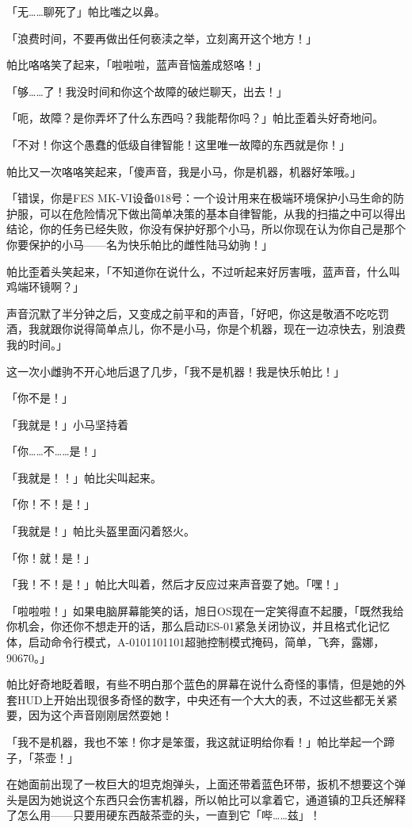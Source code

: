 「无……聊死了」帕比嗤之以鼻。

「浪费时间，不要再做出任何亵渎之举，立刻离开这个地方！」

帕比咯咯笑了起来，「啦啦啦，蓝声音恼羞成怒咯！」

「够……了！我没时间和你这个故障的破烂聊天，出去！」

「呃，故障？是你弄坏了什么东西吗？我能帮你吗？」帕比歪着头好奇地问。

「不对！你这个愚蠢的低级自律智能！这里唯一故障的东西就是你！」

帕比又一次咯咯笑起来，「傻声音，我是小马，你是机器，机器好笨哦。」

「错误，你是FES MK-VI设备018号：一个设计用来在极端环境保护小马生命的防护服，可以在危险情况下做出简单决策的基本自律智能，从我的扫描之中可以得出结论，你的任务已经失败，你没有保护好那个小马，所以你现在认为你自己是那个你要保护的小马——名为快乐帕比的雌性陆马幼驹！」

帕比歪着头笑起来，「不知道你在说什么，不过听起来好厉害哦，蓝声音，什么叫鸡端环镜啊？」

声音沉默了半分钟之后，又变成之前平和的声音，「好吧，你这是敬酒不吃吃罚酒，我就跟你说得简单点儿，你不是小马，你是个机器，现在一边凉快去，别浪费我的时间。」

这一次小雌驹不开心地后退了几步，「我不是机器！我是快乐帕比！」

「你不是！」

「我就是！」小马坚持着

「你……不……是！」

「我就是！！」帕比尖叫起来。

「你！不！是！」

「我就是！」帕比头盔里面闪着怒火。

「你！就！是！」

「我！不！是！」帕比大叫着，然后才反应过来声音耍了她。「嘿！」

「啦啦啦！」如果电脑屏幕能笑的话，旭日OS现在一定笑得直不起腰，「既然我给你机会，你还你不想走开的话，那么启动ES-01紧急关闭协议，并且格式化记忆体，启动命令行模式，A-0101101101超驰控制模式掩码，简单，飞奔，露娜，90670。」

帕比好奇地眨着眼，有些不明白那个蓝色的屏幕在说什么奇怪的事情，但是她的外套HUD上开始出现很多奇怪的数字，中央还有一个大大的表，不过这些都无关紧要，因为这个声音刚刚居然耍她！

「我不是机器，我也不笨！你才是笨蛋，我这就证明给你看！」帕比举起一个蹄子，「茶壶！」

在她面前出现了一枚巨大的坦克炮弹头，上面还带着蓝色环带，扳机不想要这个弹头是因为她说这个东西只会伤害机器，所以帕比可以拿着它，通道镇的卫兵还解释了怎么用——只要用硬东西敲茶壶的头，一直到它「哔……兹」！

